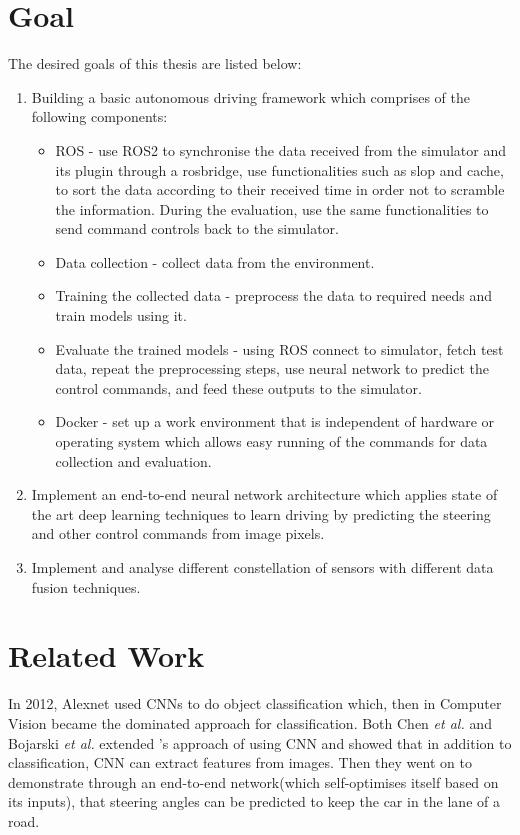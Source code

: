 \section{Goal}
    The desired goals of this thesis are listed below:

    \begin{enumerate}
    \item Building a basic autonomous driving framework which comprises of the following components:
        \begin{itemize}
        \item ROS - use ROS2 to synchronise the data received from the simulator and its plugin through a
            rosbridge, use functionalities such as slop and cache, to sort the data according to
            their received time in order not to scramble the information. During the evaluation,
            use the same functionalities to send command controls back to the simulator.
        \item Data collection - collect data from the environment.
        \item Training the collected data - preprocess the data to required needs and
            train models using it.
        \item Evaluate the trained models - using ROS connect to simulator, fetch test
            data, repeat the preprocessing steps, use neural network to predict the control commands, and
            feed these outputs to the simulator.
        \item Docker - set up a work environment that is independent of hardware or
            operating system which allows easy running of the commands for data collection
            and evaluation.
        \end{itemize}
    \item Implement an end-to-end neural network architecture which applies state of the
        art deep learning techniques to learn driving by predicting the steering and other
        control commands from image pixels.
    \item Implement and analyse different constellation of sensors with different data
        fusion techniques.
    \end{enumerate}

\section{Related Work}
In 2012, Alexnet \cite{Alexnet2012} used CNNs to do object classification which, then
in Computer Vision became the dominated approach for classification. Both Chen \textit{et
al.} \cite{chen2017} and Bojarski \textit{et al.} \cite{bojarski2016end} extended
\cite{Alexnet2012}'s approach of using CNN and showed that in addition to classification, CNN can
extract features from images. Then they went on to demonstrate through an end-to-end
network(which self-optimises itself based on its inputs), that steering angles can be
predicted to keep the car in the lane of a road.

